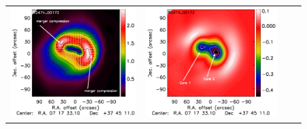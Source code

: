 \documentclass[twocolumn,traditabstract]{aa}
\begin{document}
\begin{figure}[h]
{\begin{tabular}{llll}
\includegraphics[trim=2.3cm 2.2cm 0cm 0cm, clip=true, scale=1]{Figure/Grad_RG474_00172_Ymap_zobs0p9_regrid_15_15_45.pdf} & 
\includegraphics[trim=2.3cm 2.2cm 0cm 0cm, clip=true, scale=1]{Figure/DoG_RG474_00172_Ymap_zobs0p9_regrid_15_15_45.pdf} \\

\end{tabular}}
\end{figure}
\end{document}
